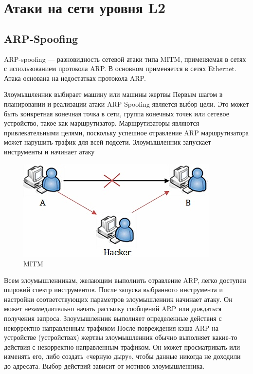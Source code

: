 \documentclass[a4paper, 12pt]{report}
\begin{document}
	\chapter{Атаки на сети уровня L2}
		\section{ARP-Spoofing}
		
		ARP-spoofing \cite{бирюков2022информационная} — разновидность сетевой атаки типа MITM, применяемая в сетях с использованием протокола ARP. В основном применяется в сетях Ethernet. Атака основана на недостатках протокола ARP.
		
		Злоумышленник выбирает машину или машины жертвы
		Первым шагом в планировании и реализации атаки ARP Spoofing является выбор цели. Это может быть конкретная конечная точка в сети, группа конечных точек или сетевое устройство, такое как маршрутизатор. Маршрутизаторы являются привлекательными целями, поскольку успешное отравление ARP маршрутизатора может нарушить трафик для всей подсети.
		Злоумышленник запускает инструменты и начинает атаку
		\begin{figure}[h!]
			\centering
			\includegraphics[scale=0.45]{img/2.jpg}
			\caption{MITM}
			\label{chargets}
		\end{figure}
		Всем злоумышленникам, желающим выполнить отравление ARP, легко доступен широкий спектр инструментов. После запуска выбранного инструмента и настройки соответствующих параметров злоумышленник начинает атаку. Он может незамедлительно начать рассылку сообщений ARP или дождаться получения запроса.
		Злоумышленник выполняет определенные действия с некорректно направленным трафиком
		После повреждения кэша ARP на устройстве (устройствах) жертвы злоумышленник обычно выполняет какие-то действия с некорректно направленным трафиком. Он может просматривать или изменять его, либо создать «черную дыру», чтобы данные никогда не доходили до адресата. Выбор действий зависит от мотивов злоумышленника.
		
	 \printbibliography
	
\end{document}

